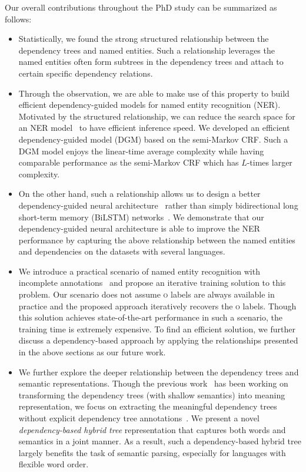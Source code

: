 Our overall contributions throughout the PhD study can be summarized as follows:
\begin{itemize}
	\item Statistically, we found the strong structured relationship between the dependency trees and named entities. 
	Such a relationship leverages the named entities often form subtrees in the dependency trees and attach to certain specific dependency relations. 
	\item Through the observation, we are able to make use of this property to build efficient dependency-guided models for named entity recognition (NER). 
	Motivated by the structured relationship, we can reduce the search space for an NER model~\cite{jie2017efficient} to have efficient inference speed.  
	We developed an efficient dependency-guided model (DGM) based on the semi-Markov CRF. 
	Such a DGM model enjoys the linear-time average complexity while having comparable performance as the semi-Markov CRF which has $L$-times larger complexity. 
	\item On the other hand, such a relationship allows us to design a better dependency-guided neural architecture~\cite{jie2019dependency} rather than simply bidirectional long short-term memory (BiLSTM) networks~\cite{hochreiter1997long}.
	We demonstrate that our dependency-guided neural architecture is able to improve the NER performance by capturing the above relationship between the named entities and dependencies on the datasets with several languages. 
	\item We introduce a practical scenario of named entity recognition with incomplete annotations~\cite{jie2019better} and propose an iterative training solution to this problem. 
	Our scenario does not assume \textsc{o} labels are always available in practice and the proposed approach iteratively recovers the \textsc{o} labels.
	Though this solution achieves state-of-the-art performance in such a scenario, the training time is extremely expensive. 
	To find an efficient solution, we further discuss a dependency-based approach by applying the relationships presented in the above sections as our future work. 
	\item We further explore the deeper relationship between the dependency trees and semantic representations. 
	Though the previous work~\cite{reddy2016transforming} has been working on transforming the dependency trees (with shallow semantics) into meaning representation, we focus on extracting the meaningful dependency trees without explicit dependency tree annotations~\cite{jie2018dependency}. 
	We present a novel {\em dependency-based hybrid tree} representation that captures both words and semantics in a joint manner.
	As a result, such a dependency-based hybrid tree largely benefits the task of semantic parsing, especially for languages with flexible word order.
	

\end{itemize}
